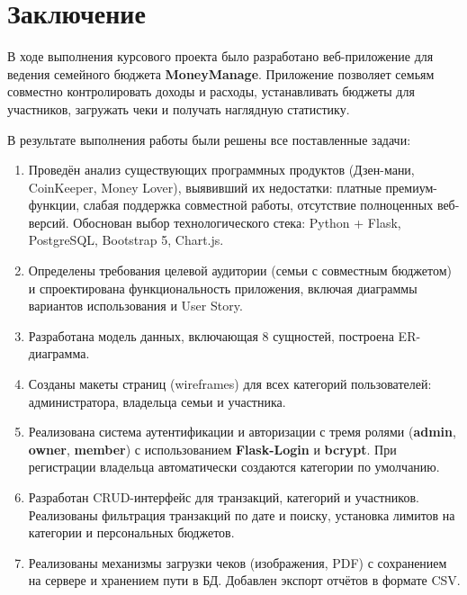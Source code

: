 \section*{Заключение}

В ходе выполнения курсового проекта было разработано веб-приложение для ведения семейного бюджета \textbf{MoneyManage}. Приложение позволяет семьям совместно контролировать доходы и расходы, устанавливать бюджеты для участников, загружать чеки и получать наглядную статистику.

В результате выполнения работы были решены все поставленные задачи:

\begin{enumerate}
    \item Проведён анализ существующих программных продуктов (Дзен-мани, CoinKeeper, Money Lover), выявивший их недостатки: платные премиум-функции, слабая поддержка совместной работы, отсутствие полноценных веб-версий. Обоснован выбор технологического стека: Python + Flask, PostgreSQL, Bootstrap 5, Chart.js.
    
    \item Определены требования целевой аудитории (семьи с совместным бюджетом) и спроектирована функциональность приложения, включая диаграммы вариантов использования и User Story.
    
    \item Разработана модель данных, включающая 8 сущностей, построена ER-диаграмма.
    
    \item Созданы макеты страниц (wireframes) для всех категорий пользователей: администратора, владельца семьи и участника.
    
    \item Реализована система аутентификации и авторизации с тремя ролями (\textbf{admin}, \textbf{owner}, \textbf{member}) с использованием \textbf{Flask-Login} и \textbf{bcrypt}. При регистрации владельца автоматически создаются категории по умолчанию.
    
    \item Разработан CRUD-интерфейс для транзакций, категорий и участников. Реализованы фильтрация транзакций по дате и поиску, установка лимитов на категории и персональных бюджетов.
    
    \item Реализованы механизмы загрузки чеков (изображения, PDF) с сохранением на сервере и хранением пути в БД. Добавлен экспорт отчётов в формате CSV.
    

\end{enumerate}
